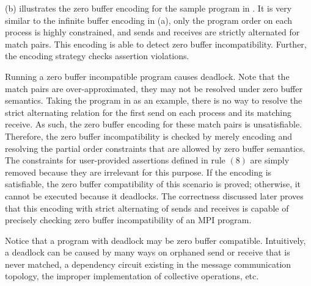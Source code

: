 \encodingzb

(b) illustrates the zero buffer encoding for the sample program in . It is very similar to the infinite buffer encoding in (a), only the program order on each process is highly constrained, and sends and receives are strictly alternated for match pairs. This encoding is able to detect zero buffer incompatibility. Further, the encoding strategy checks assertion violations.

Running a zero buffer incompatible program causes deadlock.
Note that the match pairs are over-approximated, they may not be resolved under zero buffer semantics.
Taking the program in  as an example, there is no way to resolve the strict alternating relation for the first send on each process and its matching receive. As such, the zero buffer encoding for these match pairs is unsatisfiable. Therefore, the zero buffer incompatibility is checked by merely encoding and resolving the partial order constraints that are allowed by zero buffer semantics. The constraints for user-provided assertions defined in rule $(8)$ are simply removed because they are irrelevant for this purpose. If the encoding is satisfiable, the zero buffer compatibility of this scenario is proved; otherwise, it cannot be executed because it deadlocks. The correctness discussed later proves that this encoding with strict alternating of sends and receives is capable of precisely checking zero buffer incompatibility of an MPI program.

Notice that a program with deadlock may be zero buffer compatible. Intuitively, a deadlock can be caused by many ways on orphaned send or receive that is never matched, a dependency circuit existing in the message communication topology, the improper implementation of collective operations, etc. 




